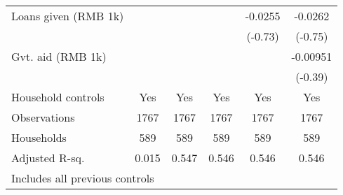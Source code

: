 {\begin{tabular}{l*{5}{c}}
Loans given (RMB 1k)&                    &                    &                    &     -0.0255        &     -0.0262        \\
                    &                    &                    &                    &     (-0.73)        &     (-0.75)        \\
Gvt. aid (RMB 1k)   &                    &                    &                    &                    &    -0.00951        \\
                    &                    &                    &                    &                    &     (-0.39)        \\
Household controls  &         Yes        &         Yes        &         Yes        &         Yes        &         Yes        \\
\hline
Observations        &        1767        &        1767        &        1767        &        1767        &        1767        \\
Households          &         589        &         589        &         589        &         589        &         589        \\
Adjusted R-sq.      &       0.015        &       0.547        &       0.546        &       0.546        &       0.546        \\
\hline\hline
\multicolumn{6}{l}{\footnotesize \tiny{Includes all previous controls}}\\
\end{tabular}
}
